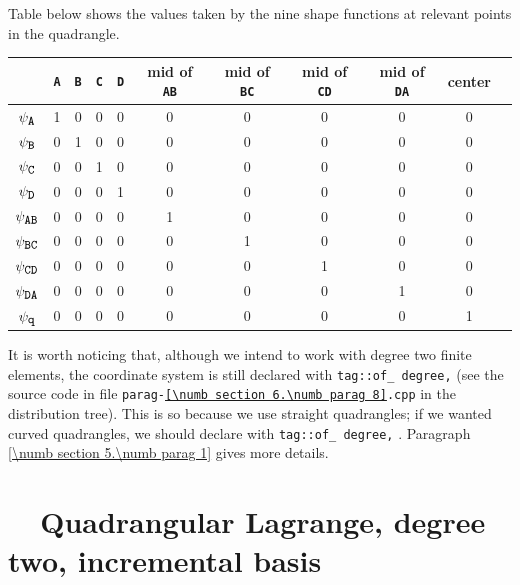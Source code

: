 Table below shows the values taken by the nine shape functions at relevant points in the quadrangle.

\begin{center}\begin{tabular}{ | c || c | c | c | c | c | c | c | c | c | c | }
  \hline
  & {\small\tt A} & {\small\tt B} & {\small\tt C} & {\small\tt D} & mid of {\small\tt AB} &
  mid of {\small\tt BC} & mid of {\small\tt CD} & mid of {\small\tt DA} & center
  \\ \hline\hline
  $ \psi_{\mbox{\small\tt A}} $ & 1 & 0 & 0 & 0 & 0 & 0 & 0 & 0 & 0
  \\ \hline
  $ \psi_{\mbox{\small\tt B}} $ & 0 & 1 & 0 & 0 & 0 & 0 & 0 & 0 & 0
  \\ \hline
  $ \psi_{\mbox{\small\tt C}} $ & 0 & 0 & 1 & 0 & 0 & 0 & 0 & 0 & 0
  \\ \hline
  $ \psi_{\mbox{\small\tt D}} $ & 0 & 0 & 0 & 1 & 0 & 0 & 0 & 0 & 0
  \\ \hline
  $ \psi_{\mbox{\small\tt AB}} $ & 0 & 0 & 0 & 0 & 1 & 0 & 0 & 0 & 0
  \\ \hline
  $ \psi_{\mbox{\small\tt BC}} $ & 0 & 0 & 0 & 0 & 0 & 1 & 0 & 0 & 0
  \\ \hline
  $ \psi_{\mbox{\small\tt CD}} $ & 0 & 0 & 0 & 0 & 0 & 0 & 1 & 0 & 0
  \\ \hline
  $ \psi_{\mbox{\small\tt DA}} $ & 0 & 0 & 0 & 0 & 0 & 0 & 0 & 1 & 0
  \\ \hline
  $ \psi_{\mbox{\small\tt q}} $ & 0 & 0 & 0 & 0 & 0 & 0 & 0 & 0 & 1
  \\ \hline
\end{tabular}\end{center}

It is worth noticing that, although we intend to work with degree two finite elements,
the coordinate system {\small\tt{}} is still declared with
{\small\tt\textcolor{tag}{tag}::of\_\,degree,} {\small\tt{}}
(see the source code in file {\small\tt parag-\ref{\numb section 6.\numb parag 8}.cpp}
in the distribution tree).
This is so because we use straight quadrangles; if we wanted curved quadrangles, we should
declare {\small\tt{}} with {\small\tt\textcolor{tag}{tag}::of\_\,degree,}
{\small\tt{}}.
Paragraph \ref{\numb section 5.\numb parag 1} gives more details.


\section{~~Quadrangular Lagrange, degree two, incremental basis}
\label{\numb section 6.\numb parag 9}

